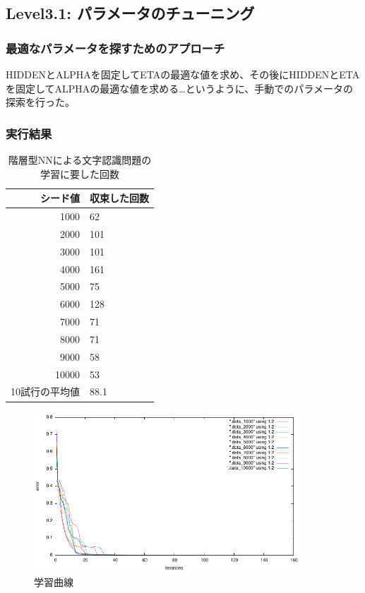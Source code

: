 \subsection{Level3.1: パラメータのチューニング}
\subsubsection{最適なパラメータを探すためのアプローチ}
HIDDENとALPHAを固定してETAの最適な値を求め、その後にHIDDENとETAを固定してALPHAの最適な値を求める…というように、手動でのパラメータの探索を行った。

\subsubsection{実行結果}

\begin{table}[htb]
 \begin{center}
  \caption{階層型NNによる文字認識問題の学習に要した回数}
  \label{table:level3}
  \begin{tabular}[htb]{r|l} \hline
   シード値 & 収束した回数 \\ \hline \hline
   1000 & 62 \\ \hline
   2000 & 101 \\ \hline
   3000 & 101 \\ \hline
   4000 & 161 \\ \hline
   5000 & 75 \\ \hline
   6000 & 128 \\ \hline
   7000 & 71 \\ \hline
   8000 & 71 \\ \hline
   9000 & 58 \\ \hline
   10000 & 53 \\ \hline \hline
   10試行の平均値 & 88.1 \\ \hline
  \end{tabular}
 \end{center}
\end{table}

\begin{figure}[h]
 \begin{center}
  \includegraphics[width=10.0cm]{figs/level3.1/3_1.pdf}
  \caption{学習曲線}
  \label{fig:level3}
 \end{center}
\end{figure}


